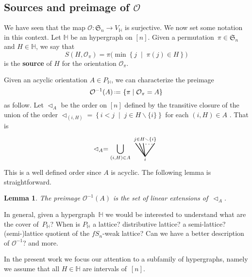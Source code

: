 \documentclass[reqno]{amsart}
\newtheorem{lemma}[theorem]{Lemma}
\theoremstyle{definition}
\newcommand{\set}[2]{\left\{ #1 \;\middle|\; #2 \right\}} %
\newcommand{\ssm}{\smallsetminus} %
\newcommand{\eqdef}{\mbox{\,\raisebox{0.2ex}{\scriptsize\ensuremath{\mathrm:}}\ensuremath{=}\,}} %
\newcommand{\defn}[1]{\textbf{\textsf{\color{PineGreen} #1}}} %
\newcommand{\fS}{\mathfrak{S}} %
\newcommand{\less}{\vartriangleleft} %
\newcommand{\Or}{\mathcal O}  %
\newcommand{\HH}{\mathbb H}  %
\begin{document}

\subsection{Sources and preimage of $\Or$} 
\label{subsec:notation}

We have seen that the map $\Or \colon \fS_n \to V_{\HH}$ is surjective.
We now set some notation in this context. Let $\HH$ be  an hypergraph on $[n]$. Given a permutation~$\pi\in\fS_n$ and $H\in \HH$,
we say that 
\begin{equation}\label{eq:source}
	S(H,\Or_\pi)=\pi\big( \min\set{j}{\pi(j)\in H} \big)
\end{equation}
is the \defn{source} of $H$ for the orientation $\Or_\pi$. 

Given an acyclic orientation $A\in P_\HH$,  we can characterize the preimage 
\[
\Or^{-1}(A) \eqdef \set{\pi}{\Or_\pi=A}
\]
as follow. Let $\less_A$ be the order on $[n]$ defined by the transitive closure of the union of 
the order $\less_{(i,H)}=\set{ i< j}{j\in H\ssm\{i\}}$ for each $(i,H)\in A$ . That is
 \[
 \less_A =  \bigcup_{(i,H)\in A} 
	\begin{tikzpicture}[scale=1,baseline=.0cm]
	\node at (0,-.45) {$\scriptstyle i$};
	\node at (0,.6) {$\scriptstyle j\in H\ssm \{i\}$};
	\node at (.2,.35) {$\ldots$};
	\draw [thick] (0,-.3)--(-.5,.4); 
	\draw [thick] (0,-.3)--(-.3,.4); 
	\draw [thick] (0,-.3)--(-.1,.4); 
	\draw [thick] (0,-.3)--(.5,.4); 
	\end{tikzpicture}
\]
This is a well defined order since $A$ is acyclic. The following lemma is straightforward.

\begin{lemma}\label{lem:prepi}
The preimage $\Or^{-1}(A)$ is the set of linear extensions of~$\less_A$.
\end{lemma}

In general, given a hypergraph~$\HH$ we would be interested to understand what are the cover of~$P_{\HH}$? 
When is $P_{\HH}$ a lattice? distributive lattice? a semi-lattice? (semi-)lattice quotient of the $fS_n$-weak lattice?
Can we have a better description of $\Or^{-1}$? and more.

In the present work we focus our attention to a subfamily of hypergraphs, namely we assume that all $H\in \HH$ are intervals of~$[n]$.

\end{document}
